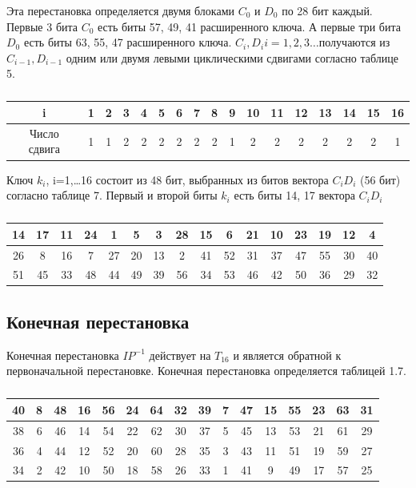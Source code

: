 Эта перестановка определяется двумя блоками $C_{0}$ и $D_0$ по 28 бит каждый. Первые 3 бита $C_{0}$ есть биты 57, 49, 41 расширенного ключа. А первые три бита $D_0$ есть биты 63, 55, 47 расширенного ключа. $C_i, D_i i=1,2,3… $получаются из $C_{i-1}, D_{i-1}$ одним или двумя левыми циклическими сдвигами согласно таблице 5.
\begin{table}[H]
    \caption{}
	\begin{tabular}{|c|c|c|c|c|c|c|c|c|c|c|c|c|c|c|c|c|}
    \hline
    i	& 1	& 2	& 3	& 4	& 5	& 6	& 7	& 8	& 9	& 10	& 11	& 12	& 13	& 14	& 15	& 16\\
    \hline
    Число сдвига	& 1	& 1	& 2	& 2	& 2	& 2	& 2	& 2	& 1	& 2	& 2	& 2	& 2	& 2	& 2 &	1\\
    \hline
    \end{tabular}
\end{table}

Ключ $k_i$, i=1,…16 состоит из 48 бит, выбранных из битов вектора $C_{i}D_{i}$ (56 бит) согласно таблице 7. Первый и второй биты $k_i$ есть биты 14, 17 вектора $C_{i}D_{i}$

\begin{table}[H]
    \caption{}
	\begin{tabular}{|c|c|c|c|c|c|c|c|c|c|c|c|c|c|c|c|}
	\hline
	14	& 17	& 11	& 24	& 1	& 5	& 3	& 28	& 15	& 6	& 21	& 10	& 23	& 19	& 12	& 4\\
	\hline
	26	& 8	& 16	& 7	& 27	& 20	& 13 &	2	& 41	& 52	& 31	& 37	& 47	& 55	& 30	& 40\\
	\hline
	51	& 45	& 33	& 48	& 44	& 49	& 39	& 56	& 34	& 53	& 46	& 42	& 50	& 36	& 29	& 32\\
	\hline
	\end{tabular}
\end{table}

\subsection{Конечная перестановка}
Конечная перестановка $IP^{-1}$ действует на $T_{16}$ и является обратной к первоначальной перестановке. Конечная перестановка определяется таблицей 1.7.
\begin{table}[H]
	\caption{}
	\begin{tabular}{|c|c|c|c|c|c|c|c|c|c|c|c|c|c|c|c|}
	\hline
	40  & 8  & 48 & 16 & 56 & 24 & 64 & 32 & 39 & 7 &  47 & 15 & 55 & 23 & 63 & 31\\
	\hline
	38 & 6  & 46 & 14 & 54 & 22 & 62 & 30 & 37 & 5  & 45 & 13 & 53 & 21 & 61 & 29\\
	\hline
	36 & 4  & 44 & 12 & 52 & 20 & 60 & 28 & 35 & 3  & 43 & 11 & 51 & 19 & 59 & 27\\
	\hline
	34 & 2  & 42 & 10 & 50 & 18 & 58 & 26 & 33 & 1  & 41 & 9  & 49 & 17 & 57 & 25\\
	\hline
	\end{tabular}
\end{table}
